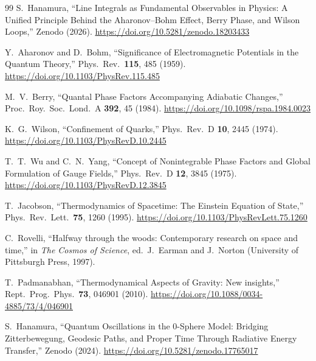 \documentclass[%
 reprint,
 amsmath,amssymb,
 aps,
 prb,
]{revtex4-2}
\numberwithin{equation}{section}
\begin{document}
\begin{thebibliography}{99}
S.~Hanamura, ``Line Integrals as Fundamental Observables in Physics: A Unified Principle Behind the Aharonov--Bohm Effect, Berry Phase, and Wilson Loops,'' Zenodo (2026). \href{https://doi.org/10.5281/zenodo.18203433}{https://doi.org/10.5281/zenodo.18203433}


Y.~Aharonov and D.~Bohm,
``Significance of Electromagnetic Potentials in the Quantum Theory,''
Phys.\ Rev.\ \textbf{115}, 485 (1959).
\href{https://doi.org/10.1103/PhysRev.115.485}{https://doi.org/10.1103/PhysRev.115.485}

M.~V.~Berry,
``Quantal Phase Factors Accompanying Adiabatic Changes,''
Proc.\ Roy.\ Soc.\ Lond.\ A \textbf{392}, 45 (1984).
\href{https://doi.org/10.1098/rspa.1984.0023}{https://doi.org/10.1098/rspa.1984.0023}

K.~G.~Wilson,
``Confinement of Quarks,''
Phys.\ Rev.\ D \textbf{10}, 2445 (1974).
\href{https://doi.org/10.1103/PhysRevD.10.2445}{https://doi.org/10.1103/PhysRevD.10.2445}

T.~T.~Wu and C.~N.~Yang,
``Concept of Nonintegrable Phase Factors and Global Formulation of Gauge Fields,''
Phys.\ Rev.\ D \textbf{12}, 3845 (1975).
\href{https://doi.org/10.1103/PhysRevD.12.3845}{https://doi.org/10.1103/PhysRevD.12.3845}

T.~Jacobson,
``Thermodynamics of Spacetime: The Einstein Equation of State,''
Phys.\ Rev.\ Lett.\ \textbf{75}, 1260 (1995).
\href{https://doi.org/10.1103/PhysRevLett.75.1260}{https://doi.org/10.1103/PhysRevLett.75.1260}

C.~Rovelli,
``Halfway through the woods: Contemporary research on space and time,''
in \textit{The Cosmos of Science},
ed.\ J.~Earman and J.~Norton
(University of Pittsburgh Press, 1997).

T.~Padmanabhan,
``Thermodynamical Aspects of Gravity: New insights,''
Rept.\ Prog.\ Phys.\ \textbf{73}, 046901 (2010).
\href{https://doi.org/10.1088/0034-4885/73/4/046901}{https://doi.org/10.1088/0034-4885/73/4/046901}

S.~Hanamura,
``Quantum Oscillations in the 0-Sphere Model: Bridging Zitterbewegung, Geodesic Paths, and Proper Time Through Radiative Energy Transfer,''
Zenodo (2024).
\href{https://doi.org/10.5281/zenodo.17765017}{https://doi.org/10.5281/zenodo.17765017}

\end{thebibliography}
\end{document}
